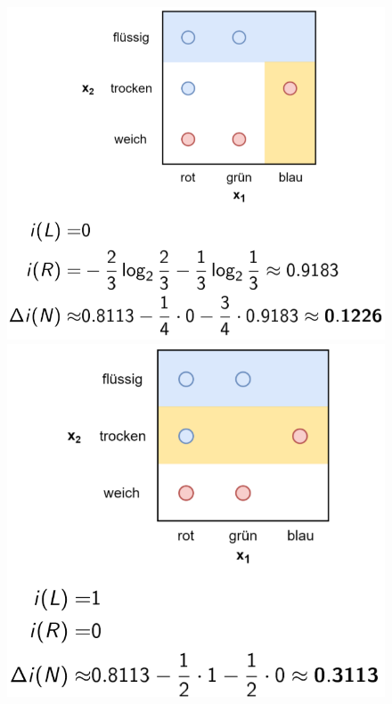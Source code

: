 \documentclass{report}
\begin{document}
\begin{figure}[H]
  \centering
  \begin{minipage}[b]{0.4\textwidth}
    \includegraphics[scale=.235]{ml07_17}
  \end{minipage}
  \begin{minipage}[b]{0.4\textwidth}
    \includegraphics[scale=.235]{ml07_18}
  \end{minipage}
\end{figure}
\end{document}

